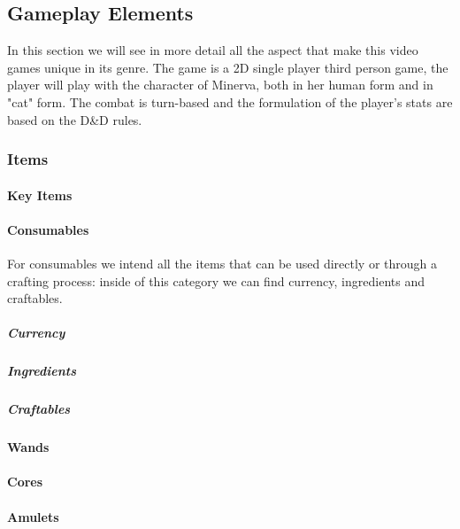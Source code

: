 \subsection{Gameplay Elements}

In this section we will see in more detail all the aspect that make this video games unique in its genre. The game is a 2D single player third person game, the player will play with the character of Minerva, both in her human form and in "cat" form. The combat is turn-based and the formulation of the player's stats are based on the D\&D rules.



\subsubsection{Items}

\paragraph{Key Items}


\pagebreak
\paragraph{Consumables}
For consumables we intend all the items that can be used directly or through a crafting process: inside of this category we can find currency, ingredients and craftables. \\
\subparagraph{Currency}


\subparagraph{Ingredients}


\subparagraph{Craftables}


\paragraph{Wands}


\paragraph{Cores}


\paragraph{Amulets}


